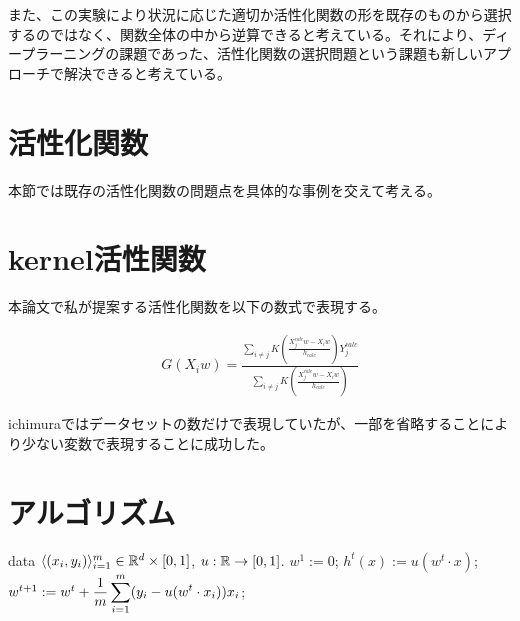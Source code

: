また、この実験により状況に応じた適切か活性化関数の形を既存のものから選択するのではなく、関数全体の中から逆算できると考えている。それにより、ディープラーニングの課題であった、活性化関数の選択問題という課題も新しいアプローチで解決できると考えている。


\section{活性化関数}
本節では既存の活性化関数の問題点を具体的な事例を交えて考える。


\section{kernel活性関数}



本論文で私が提案する活性化関数を以下の数式で表現する。


\begin{eqnarray}
G(X_iw)=\frac{\sum_{i\neq j} K\left(\frac{X^{calc}_j w - X_i w}{h_{calc}}\right)Y^{calc}_j}{\sum_{i\neq j} K\left(\frac{X^{calc}_j w - X_i w}{h_{calc}}\right)}
\end{eqnarray}

ichimuraではデータセットの数だけで表現していたが、一部を省略することにより少ない変数で表現することに成功した。


\section{アルゴリズム}


\begin{algorithm}[!t]
	\caption{\KAF}
	\label{alg:fixed-u-alg}
\begin{algorithmic}
	 data $\langle (x_i, y_i) \rangle_{i=1}^m \in
	\mathbb{R}^d \times [0, 1]$, $u: \mathbb{R} \rightarrow [0, 1]$.
	\STATE $w^1 := 0$;
	\STATE $h^t(x) := u(w^t \cdot x)$;
	\STATE $w^{t+1} := w^t + \displaystyle\frac{1}{m} \sum_{i=1}^m (y_i - u(w^t
	\cdot x_i)) x_i$;
	\ENDFOR
\end{algorithmic}
\end{algorithm}





